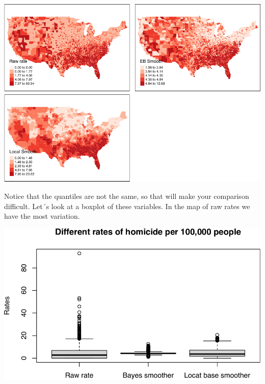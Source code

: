 \documentclass[
  krantz2]{krantz}
\makeatletter
\newenvironment{Shaded}{\begin{snugshade}}{\end{snugshade}}
\newcommand{\AttributeTok}[1]{\textcolor[rgb]{0.61,0.61,0.61}{#1}}
\newcommand{\CommentTok}[1]{\textcolor[rgb]{0.37,0.37,0.37}{\textit{#1}}}
\newcommand{\FunctionTok}[1]{\textcolor[rgb]{0,0,0}{#1}}
\newcommand{\NormalTok}[1]{#1}
\newcommand{\SpecialCharTok}[1]{\textcolor[rgb]{0,0,0}{#1}}
\newcommand{\StringTok}[1]{\textcolor[rgb]{0.5,0.5,0.5}{#1}}
\newenvironment{kframe}{%
\medskip{}
\setlength{\fboxsep}{.8em}
 \def\at@end@of@kframe{}%
 \ifinner\ifhmode%
  \def\at@end@of@kframe{\end{minipage}}%
  \begin{minipage}{\columnwidth}%
 \fi\fi%
 \def\FrameCommand##1{\hskip\@totalleftmargin \hskip-\fboxsep
 \colorbox{shadecolor}{##1}\hskip-\fboxsep
     \hskip-\linewidth \hskip-\@totalleftmargin \hskip\columnwidth}%
 \MakeFramed {\advance\hsize-\width
   \@totalleftmargin\z@ \linewidth\hsize
   \@setminipage}}%
 {\par\unskip\endMakeFramed%
 \at@end@of@kframe}
\renewenvironment{Shaded}{\begin{kframe}}{\end{kframe}}
\makeatother
\begin{document}
\includegraphics{crime_mapping_files/figure-latex/unnamed-chunk-116-1.pdf}

Notice that the quantiles are not the same, so that will make your comparison difficult. Let´s look at a boxplot of these variables. In the map of raw rates we have the most variation.

\begin{Shaded}
\end{Shaded}

\includegraphics{crime_mapping_files/figure-latex/unnamed-chunk-117-1.pdf}
\end{document}
